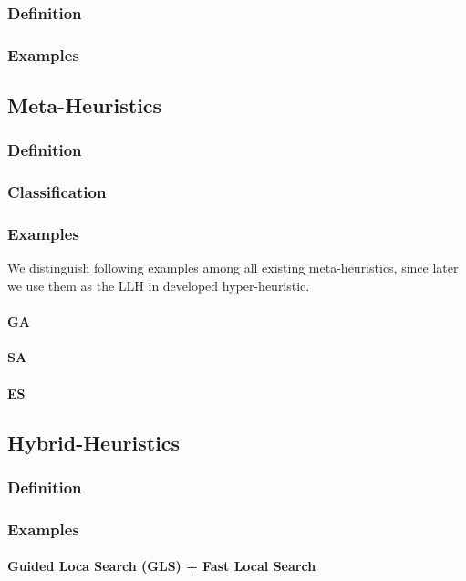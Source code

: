\subsubsection{Definition}
\subsubsection{Examples}

\subsection{Meta-Heuristics}
\subsubsection{Definition}
\subsubsection{Classification}
\subsubsection{Examples}
We distinguish following examples among all existing meta-heuristics, since later we use them as the LLH in developed hyper-heuristic.
\paragraph{GA}
\paragraph{SA}
\paragraph{ES}

\subsection{Hybrid-Heuristics}
\subsubsection{Definition}
\subsubsection{Examples}
\paragraph{Guided Loca Search (GLS) + Fast Local Search} \cite{tsang1997fast}
